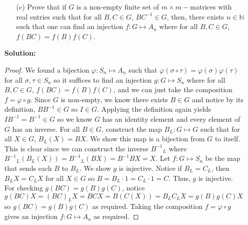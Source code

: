 \documentclass[letterpaper,12pt]{article}
\theoremstyle{definition}
\begin{document}
\pagebreak
\begin{enumerate}
    \item[] \begin{enumerate}
        \item[(c)] Prove that if $G$ is a non-empty finite set of $m\times m-$matrices with real entries such that for all $B,C \in G$, $BC^{-1} \in G$, then, there exists $n \in \mathbb{N}$ such that one can find an injection $f:G\mapsto A_n$ where for all $B,C \in G$, $f(BC) = f(B)f(C)$.
    \end{enumerate}
    \begin{mdframed}
        \textbf{Solution:}
        \begin{proof}
        We found a bijection $\varphi: S_n \mapsto A_n$ such that $\varphi(\sigma \circ \tau) = \varphi(\sigma)\varphi(\tau)$ for all $\sigma,\tau \in S_n$ so it suffices to find an injection $g:G \mapsto S_n$ where for all $B,C \in G$, $f(BC) = f(B)f(C)$, and we can just take the composition $f = \varphi \circ g$. Since $G$ is non-empty, we know there exists $B \in G$ and notice by its definition, $BB^{-1} \in G$ so $I \in G$. Applying the definition again yields $IB^{-1} = B^{-1} \in G$ so we know $G$ has an identity element and every element of $G$ has an inverse. For all $B \in G$, construct the map $B_L : G \mapsto G$ such that for all $X \in G$, $B_L(X) = BX$. We show this map is a bijection from $G$ to itself. This is clear since we can construct the inverse ${B^{-1}}_L$ where ${B^{-1}}_L(B_L(X)) = {B^{-1}}_L(BX) = B^{-1}BX = X$. Let $f: G \mapsto S_n$ be the map that sends each $B$ to $B_L$. We show $g$ is injective. Notice if $B_L = C_L$, then $B_L X = C_L X$ for all $X \in G$ so $B = B_L \cdot 1 = C_L \cdot 1 = C$. Thus, $g$ is injective. For checking $g(BC) = g(B)g(C)$, notice $g(BC)X = (BC)_L X = BC X = B(C(X)) = B_LC_L X = g(B)g(C) X$ so $g(BC) = g(B)g(C)$ as required. Taking the composition $f = \varphi \circ g$ gives an injection $f: G \mapsto A_n$ as required.
        \end{proof}
    \end{mdframed}
\end{enumerate}
\end{document}
